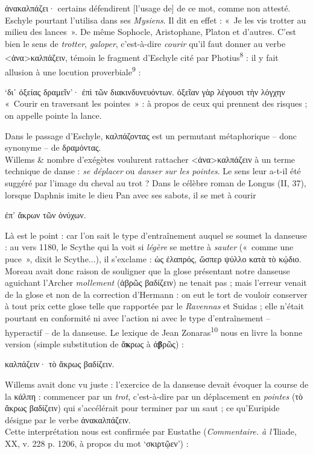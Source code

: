 \documentclass[12pt]{book}%
\newcommand{\italique}[1]{\textit{#1}}%
\newcommand{\citComm}[1]{\begin{quoting}[vskip=0pt] #1 \end{quoting}}%
\newcommand{\marqueur}[1]{\textsuperscript{#1}}%
\newenvironment{groupe}{%
\pstart%
\ledgroup%
}{%
\pend %
}%
\begin{document}
\begin{pages}
\begin{Leftside}
\begin{groupe}
{{{ἀνακαλπάζει· certains défendirent [l'usage de] de ce mot, comme non attesté. Eschyle pourtant l'utilisa dans ses \italique{Mysiens}. Il dit en effet : «~Je les vis trotter au milieu des lances~». De même Sophocle, Aristophane, Platon et d'autres.}%
C'est bien le sens de \italique{trotter}, \italique{galoper}, c'est-à-dire \italique{courir} qu'il faut donner au verbe <ἀνα>καλπάζειν, témoin le fragment d'Eschyle cité par Photius\marqueur{8} : il y fait allusion à une locution proverbiale\marqueur{9} :%
\citComm{`δι᾽ ὀξείας δραμεῖν'· ἐπὶ τῶν διακινδυνευόντων. ὀξεῖαν γὰρ λέγουσι τὴν λόγχην\\
«~Courir en traversant les pointes~» : à propos de ceux qui prennent des risques ; on appelle pointe la lance.}%
Dans le passage d'Eschyle, καλπάζοντας est un permutant métaphorique -- donc synonyme -- de δραμόντας.\\
Willems \& nombre d'exégètes voulurent rattacher <ἀνα>καλπάζειν à un terme technique de danse : \italique{se déplacer} ou \italique{danser sur les pointes}. Le sens leur a-t-il été suggéré par l'image du cheval au trot ? Dans le célèbre roman de Longus (II, 37), lorsque Daphnis imite le dieu Pan avec ses sabots, il se met à courir %
\citComm{ἐπ' ἄκρων τῶν ὀνύχων.}%
Là est le point : car l'on sait le type d'entraînement auquel se soumet la danseuse : au vers 1180, le Scythe qui la voit si \italique{légère} se mettre à \italique{sauter} («~comme une puce~», dixit le Scythe...), il s'exclame : ὡς ἐλαπρός, ὥσπερ ψύλλο κατὰ τὸ κῴδιο.
Moreau avait donc raison de souligner que la glose présentant notre danseuse aguichant l'Archer \italique{mollement} (ἁβρῶς βαδίζειν) ne tenait pas ; mais l'erreur venait de la glose et non de la correction d'Hermann : on eut le tort de vouloir conserver à tout prix cette glose telle que rapportée par le \italique{Ravennas} et Suidas ; elle n'était pourtant en conformité ni avec l'action ni avec le type d'entraînement -- hyperactif -- de la danseuse.
Le lexique de Jean Zonaras\marqueur{10} nous en livre la bonne version (simple substitution de ἄ\textbf{κ}ρως à ἁ\textbf{β}ρῶς) :%
\citComm{καλπάζειν· τὸ ἄκρως βαδίζειν.}%
Willems avait donc vu juste : l'exercice de la danseuse devait évoquer la course de la κάλπη : commencer par un \italique{trot}, c'est-à-dire par un déplacement en \italique{pointes} (τὸ ἄκρως βαδίζειν) qui s'accélérait pour terminer par un saut ; ce qu'Euripide désigne par le verbe ἀνακαλπάζειν.\\
Cette interprétation nous est confirmée par Eustathe (\italique{Commentaire. à l'}Iliade, XX, v. 228 p. 1206, à propos du mot `σκιρτῷεν') :%
}}
\end{groupe}
\end{Leftside}
\end{pages}
\end{document}
